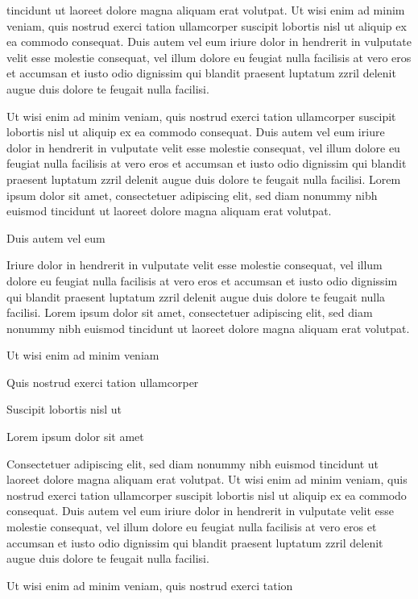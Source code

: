 \documentclass[11pt]{article}\makeatletter
\begin{document}
      tincidunt ut laoreet dolore magna aliquam erat volutpat. Ut wisi enim
      ad minim veniam, quis nostrud exerci tation ullamcorper suscipit
      lobortis nisl ut aliquip ex ea commodo consequat. Duis autem vel eum
      iriure dolor in hendrerit in vulputate velit esse molestie consequat,
      vel illum dolore eu feugiat nulla facilisis at vero eros et accumsan
      et iusto odio dignissim qui blandit praesent luptatum zzril delenit
      augue duis dolore te feugait nulla facilisi.\par Ut wisi enim ad minim veniam, quis nostrud exerci tation
      ullamcorper suscipit lobortis nisl ut aliquip ex ea commodo
      consequat. Duis autem vel eum iriure dolor in hendrerit in vulputate
      velit esse molestie consequat, vel illum dolore eu feugiat nulla
      facilisis at vero eros et accumsan et iusto odio dignissim qui blandit
      praesent luptatum zzril delenit augue duis dolore te feugait nulla
      facilisi. Lorem ipsum dolor sit amet, consectetuer adipiscing elit,
      sed diam nonummy nibh euismod tincidunt ut laoreet dolore magna
      aliquam erat volutpat. \par Duis autem vel eum \par Iriure dolor in hendrerit in vulputate velit esse molestie
      consequat, vel illum dolore eu feugiat nulla facilisis at vero eros et
      accumsan et iusto odio dignissim qui blandit praesent luptatum zzril
      delenit augue duis dolore te feugait nulla facilisi. Lorem ipsum dolor
      sit amet, consectetuer adipiscing elit, sed diam nonummy nibh euismod
      tincidunt ut laoreet dolore magna aliquam erat volutpat. \par Ut wisi enim ad minim veniam\par Quis nostrud exerci tation ullamcorper \par Suscipit lobortis nisl ut \par Lorem ipsum dolor sit amet\par Consectetuer adipiscing elit, sed diam nonummy nibh euismod
      tincidunt ut laoreet dolore magna aliquam erat volutpat. Ut wisi enim
      ad minim veniam, quis nostrud exerci tation ullamcorper suscipit
      lobortis nisl ut aliquip ex ea commodo consequat. Duis autem vel eum
      iriure dolor in hendrerit in vulputate velit esse molestie consequat,
      vel illum dolore eu feugiat nulla facilisis at vero eros et accumsan
      et iusto odio dignissim qui blandit praesent luptatum zzril delenit
      augue duis dolore te feugait nulla facilisi.\par Ut wisi enim ad minim veniam, quis nostrud exerci tation
\end{document}
